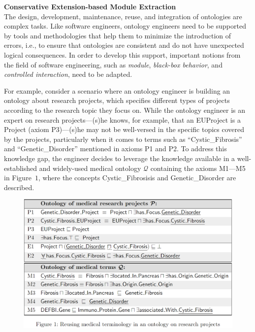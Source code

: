 \documentclass[12pt,a4paper]{article}
\newenvironment{problems}[2][{\color{purple}Question}]{\begin{trivlist}
\item[\hskip \labelsep {\bfseries #1}\hskip \labelsep {\bfseries #2.}]}{\end{trivlist}}
\begin{document}
\begin{problems}{{\color{purple}6 (with 1 bonus mark)}}
\textbf{Conservative Extension-based Module Extraction}\\
The design, development, maintenance, reuse, and integration of ontologies are complex tasks. Like software engineers, ontology engineers need to be supported by tools and methodologies that help them to minimize the introduction of errors, i.e., to ensure that ontologies are consistent and do not have unexpected logical consequences. In order to develop this support, important notions from the field of software engineering, such as \emph{module}, \emph{black-box behavior}, and \emph{controlled interaction}, need to be adapted.

For example, consider a scenario where an ontology engineer is building an ontology about research projects, which specifies different types of projects according to the research topic they focus on. While the ontology engineer is an expert on research projects---(s)he knows, for example, that an EUProject is a Project (axiom P3)---(s)he may not be well-versed in the specific topics covered by the projects, particularly when it comes to terms such as ``\textsf{Cystic\_Fibrosis}'' and ``\textsf{Genetic\_Disorder}'' mentioned in axioms P1 and P2. To address this knowledge gap, the engineer decides to leverage the knowledge available in a well-established and widely-used medical ontology $\mathcal{Q}$ containing the axioms \textsf{M1---M5} in Figure~$1$, where the concepts \textsf{Cystic\_Fibrosisis} and \textsf{Genetic\_Disorder} are described.

\begin{figure}[ht]
    \centering
    \includegraphics[width=0.75\columnwidth]{ontology.png}
    \label{pic3}
\end{figure}


\end{problems}
\end{document}
